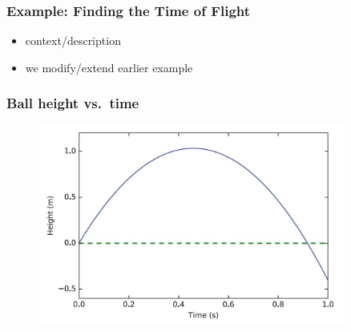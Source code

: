 \documentclass[english,14pt]{beamer}
\begin{document}
\begin{frame}[fragile]

\frametitle{Example: Finding the Time of Flight}

\begin{itemize}
	\item context/description
	\item we modify/extend earlier example
\end{itemize}


\end{frame}


\begin{frame}[fragile]

\frametitle{Ball height vs.\ time}

\begin{figure}[ht]
	\centering
	\includegraphics[width=0.9\textwidth]{figures/LLp66output}
\end{figure}

\end{frame}

\end{document}

